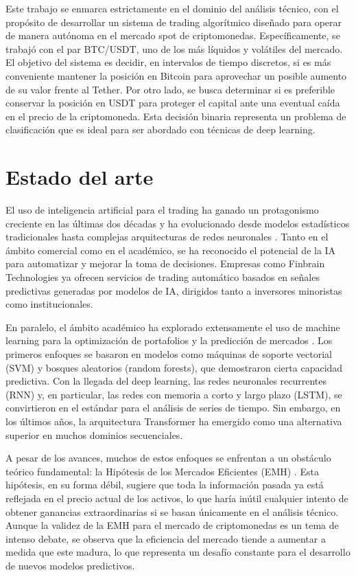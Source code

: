 Este trabajo se enmarca estrictamente en el dominio del análisis técnico, con el propósito de desarrollar un sistema de trading algorítmico diseñado para operar de manera autónoma en el mercado spot de criptomonedas. Específicamente, se trabajó con el par BTC/USDT, uno de los más líquidos y volátiles del mercado. El objetivo del sistema es decidir, en intervalos de tiempo discretos, si es más conveniente mantener la posición en Bitcoin para aprovechar un posible aumento de su valor frente al Tether. Por otro lado, se busca determinar si es preferible conservar la posición en USDT para proteger el capital ante una eventual caída en el precio de la criptomoneda. Esta decisión binaria representa un problema de clasificación que es ideal para ser abordado con técnicas de deep learning.

\section{Estado del arte}

El uso de inteligencia artificial para el trading ha ganado un protagonismo creciente en las últimas dos décadas y ha evolucionado desde modelos estadísticos tradicionales hasta complejas arquitecturas de redes neuronales \cite{coelho2024transformers}. Tanto en el ámbito comercial como en el académico, se ha reconocido el potencial de la IA para automatizar y mejorar la toma de decisiones. Empresas como 	Finbrain Technologies \cite{Finbrain:url} ya ofrecen servicios de trading automático basados en señales predictivas generadas por modelos de IA, dirigidos tanto a inversores minoristas como institucionales.

En paralelo, el ámbito académico ha explorado extensamente el uso de machine learning para la optimización de portafolios y la predicción de mercados \cite{paul2024financial}. Los primeros enfoques se basaron en modelos como máquinas de soporte vectorial (SVM) y bosques aleatorios (random forests), que demostraron cierta capacidad predictiva. Con la llegada del deep learning, las redes neuronales recurrentes (RNN) y, en particular, las redes con memoria a corto y largo plazo (LSTM), se convirtieron en el estándar para el análisis de series de tiempo. Sin embargo, en los últimos años, la arquitectura Transformer ha emergido como una alternativa superior en muchos dominios secuenciales.

A pesar de los avances, muchos de estos enfoques se enfrentan a un obstáculo teórico fundamental: la Hipótesis de los Mercados Eficientes (EMH) \cite{Fama:1970}. Esta hipótesis, en su forma débil, sugiere que toda la información pasada ya está reflejada en el precio actual de los activos, lo que haría inútil cualquier intento de obtener ganancias extraordinarias si se basan únicamente en el análisis técnico. Aunque la validez de la EMH para el mercado de criptomonedas es un tema de intenso debate, se observa que la eficiencia del mercado tiende a aumentar a medida que este madura, lo que representa un desafío constante para el desarrollo de nuevos modelos predictivos.


